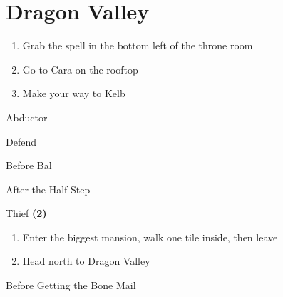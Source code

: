 \chapter{Dragon Valley}

\vspace{\baselineskip}

\begin{paracol}{2}

\begin{enumerate}
    \item Grab the  spell in the bottom left of the throne room
    \item Go to Cara on the rooftop
    \item Make your way to Kelb
\end{enumerate}

\begin{boss}{Abductor}
	\varwb
	\begin{round}{1}
		\galuf Defend
        \faris \leftCommand{\gilToss}
    \end{round}
	\varwe
\end{boss}

\switchcolumn*
\vspace{-1cm}
\begin{steproute}{Before Bal}
\end{steproute}

\switchcolumn
\begin{menu}{After the Half Step}
    \varwb
    \begin{itemMenu}
        \hiPotionMenu {}
    \end{itemMenu}
    \begin{jobMenu}
        \bartz Thief \textbf{(2\pointRight)} \ability{!\escape} \optimize
    \end{jobMenu}
    \varwe
\end{menu}

\begin{enumerate}[resume]
    \item Enter the biggest mansion, walk one tile inside, then leave
    \item Head north to Dragon Valley
\end{enumerate}

\switchcolumn
\begin{steproute}{Before Getting the Bone Mail}
\end{steproute}


\end{paracol}
